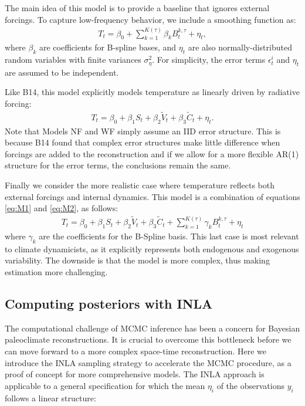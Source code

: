 \documentclass[12pt]{amsart}
\theoremstyle{plain}
\theoremstyle{definition}
\theoremstyle{remark}
\begin{document}
The main idea of this model is to provide a baseline that ignores external forcings. To capture low-frequency behavior, we include a smoothing function as: 
  \begin{align}\label{eq:M1}
    T_t=\beta_0+\sum_{k=1}^{K(\tau)}\beta_k B_t^{k,\tau}+\eta_t,
  \end{align}
where $\beta_k$ are coefficients for B-spline bases, and
$\eta_t$ are also normally-distributed random variables with finite variances
$\sigma^2_{\eta}$. For simplicity, the error terms $\epsilon^i_t$ and $\eta_t$
are assumed to be independent.  

Like B14, this model explicitly models temperature as linearly driven by radiative forcing:
  \begin{align}\label{eq:M2}
    T_t=\beta_0+\beta_1S_t+\beta_2\tilde V_t+\beta_3\tilde C_t+\eta_t.
  \end{align}
Note that Models NF and WF simply assume an IID error structure. This is because B14 
found that complex error structures make little difference when forcings are
added to the reconstruction and if we allow for a more flexible AR(1) structure for the error terms, the conclusions remain the same.

Finally we consider the more realistic case where temperature reflects both external forcings and internal dynamics. This model is a combination of equations \eqref{eq:M1} and \eqref{eq:M2}, as follows:
  \begin{align}\label{eq:M3}
    T_t=\beta_0+\beta_1S_t+\beta_2\tilde V_t+\beta_3\tilde C_t+\sum_{k=1}^{K(\tau)}\gamma_k B_t^{k,\tau}+\eta_t
  \end{align}
  where $\gamma_k$ are the coefficients for the B-Spline basis. 
  This last case is most relevant to climate dynamicists, as it explicitly represents both endogenous and exogenous variability. The downside is that the model is more complex, thus making estimation more challenging.

\subsection{Computing posteriors with INLA}

The computational challenge of MCMC inference has been a concern for Bayesian paleoclimate reconstructions. It is crucial to overcome this  bottleneck before we can move forward to a more complex space-time reconstruction. Here we introduce the INLA sampling strategy to accelerate the MCMC procedure, as a proof of concept for more comprehensive models. The INLA approach is applicable to a general specification for which the mean $\eta_i$ of the observations $y_i$ follows a linear structure:
\end{document}

